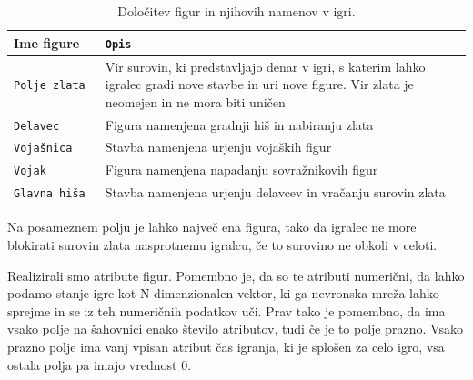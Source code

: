 \documentclass[a4paper, 12pt]{book}
\begin{document}
\begin{table}
	\begin{center}
		\begin{tabular}{p{0.2\linewidth}|p{0.8\linewidth}}
			Ime figure        & {\tt Opis} \\ \hline
			{\tt Polje zlata} & Vir surovin, ki predstavljajo denar v igri, s katerim lahko igralec gradi nove stavbe in uri nove figure. 
								Vir zlata je neomejen in ne mora biti uničen \\
			{\tt Delavec}     & Figura namenjena gradnji hiš in nabiranju zlata \\
			{\tt Vojašnica}   & Stavba namenjena urjenju vojaških figur \\
			{\tt Vojak}       & Figura namenjena napadanju sovražnikovih figur \\
			{\tt Glavna hiša} & Stavba namenjena urjenju delavcev in vračanju surovin zlata \\
		\end{tabular}
	\end{center}
	\caption{Določitev figur in njihovih namenov v igri.}
	\label{tableFiguresDescription}
\end{table}

Na posameznem polju je lahko največ ena figura, tako da igralec ne more blokirati surovin zlata nasprotnemu igralcu, če to surovino ne obkoli v celoti.

Realizirali smo atribute figur. 
Pomembno je, da so te atributi numerični, da lahko podamo stanje igre kot N-dimenzionalen vektor, ki ga nevronska mreža lahko sprejme in se iz teh numeričnih podatkov uči.
Prav tako je pomembno, da ima vsako polje na šahovnici enako število atributov, tudi če je to polje prazno.
Vsako prazno polje ima vanj vpisan atribut čas igranja, ki je splošen za celo igro, vsa ostala polja pa imajo vrednost 0.
\end{document}
